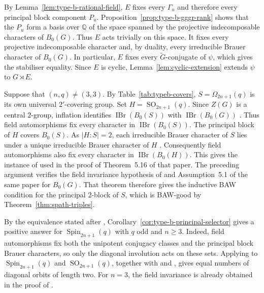 \documentclass[10pt]{amsart}
\theoremstyle{definition}
\renewcommand{\geq}{\geqslant}
\let\oldendproof\endproof
\renewenvironment{proof}[1][\proofname]{%
  \oldproof[\bfseries #1]%
}{\oldendproof}
\DeclareMathOperator{\IBr}{IBr}
\numberwithin{equation}{section}
\numberwithin{table}{section}
\begin{document}
\begin{proof}
By Lemma~\ref{lem:type-b-rational-field}, $E$ fixes every $\Gamma_u$
and therefore every principal block component $P_u$.
Proposition~\ref{prop:type-b-gggr-rank} shows that the $P_u$ form a
basis over $\mathbb Q$ of the space spanned by the projective
indecomposable characters of $B_0(G)$.
Thus $E$ acts trivially on this space. It fixes every projective
indecomposable character and, by duality, every irreducible Brauer
character of $B_0(G)$. In particular, $E$ fixes every
$\widetilde G$-conjugate of $\psi$, which gives the stabiliser equality.
Since $E$ is cyclic, Lemma~\ref{lem:cyclic-extension} extends $\psi$
to $G\rtimes E$.

Suppose that $(n,q)\neq(3,3)$. By Table~\ref{tab:typeb-covers},
$S=\Omega_{2n+1}(q)$ is its own universal $2'$-covering group.
Set $H=\operatorname{SO}_{2n+1}(q)$.
Since $Z(G)$ is a central $2$-group, inflation identifies
$\IBr(B_0(S))$ with $\IBr(B_0(G))$
\cite[Theorem~9.10]{Navarro1998}. Thus field automorphisms
fix every character in $\IBr(B_0(S))$.
The principal block of $H$ covers $B_0(S)$.
As $|H:S|=2$, each irreducible Brauer character of $S$ lies
under a unique irreducible Brauer character of $H$
\cite[Theorem~8.11]{Navarro1998}.
Consequently field automorphisms also fix every character in
$\IBr(B_0(H))$.
This gives the instance of
\cite[Corollary~5.15]{FengYuZhang2024} used in the proof of
Theorem~5.16 of that paper.
The preceding argument verifies the field invariance hypothesis of
\cite[Theorem~5.16]{FengYuZhang2024} and Assumption~5.1 of the same paper
for $B_0(G)$. That theorem therefore gives the inductive BAW condition
for the principal $2$-block of $S$, which is BAW-good by
Theorem~\ref{thm:spath-triples}.
\end{proof}

By the equivalence stated after
\cite[Question~5.27]{FengYuZhang2024},
Corollary~\ref{cor:type-b-principal-selector} gives a positive answer
for $\operatorname{Spin}_{2n+1}(q)$ with $q$ odd and $n\geq3$.
Indeed, field automorphisms fix both the unipotent conjugacy classes and
the principal block Brauer characters, so only the diagonal involution
acts on these sets. Applying \cite[Proposition~2.7]{Chaneb2021} to
$\operatorname{Spin}_{2n+1}(q)$ and $\operatorname{SO}_{2n+1}(q)$,
together with \cite[Theorem~21.14]{CabanesEnguehard2004} and
\cite[Theorem~8.11]{Navarro1998}, gives equal numbers of diagonal
orbits of length two. For $n=3$, the field invariance is already obtained
in the proof of \cite[Corollary~5.17]{FengYuZhang2024}.
\end{document}
